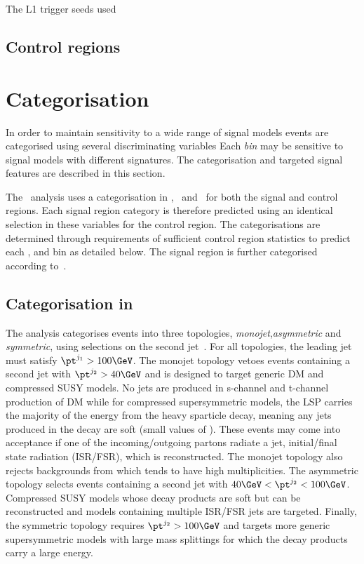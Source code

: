 The L1 trigger seeds used 
\subsection{Control regions}

\section{Categorisation}
\label{sec:cat}
In order to maintain sensitivity to a wide range of signal models events are categorised using
several discriminating variables Each \emph{bin} may be sensitive to signal models with different 
signatures. The categorisation and targeted signal features are described in this section.

The \alphat~analysis uses a categorisation in \njet, \nb~and \scalht~for both 
the signal and control regions. Each signal region category is therefore predicted using an identical 
selection in these variables for the control region. The categorisations are determined through requirements of sufficient
control region statistics to predict each \njet, \nb and \scalht bin as detailed below. The signal region is 
further categorised according to~\mht. 

\subsection{Categorisation in \njet}

The \alphat analysis categorises events into three topologies, \emph{monojet},\emph{asymmetric} 
and \emph{symmetric}, using selections on the second jet~\pt. For all topologies, the leading
jet must satisfy $\pt^{j_1} > 100 \GeV$.  The monojet topology vetoes events containing a second 
jet with $\pt^{j_2} > 40 \GeV$ and is designed to target generic DM 
and compressed SUSY models. No jets are produced in s-channel and t-channel production of DM
while for compressed supersymmetric models, the LSP carries the majority of the energy from 
the heavy sparticle decay, meaning any jets produced in the decay are soft (small values of \pt). 
These events may come into acceptance if one of the incoming/outgoing partons radiate a jet, initial/final state
radiation (ISR/FSR), which is reconstructed. The monojet topology also rejects backgrounds from 
\ttbar which tends to have high \njet multiplicities. The asymmetric topology selects events 
containing a second jet with $40 \GeV < \pt^{j_2} < 100 \GeV$.
Compressed SUSY models whose decay products are soft but can be reconstructed and models
containing multiple ISR/FSR jets are targeted. Finally, the symmetric topology requires  
$\pt^{j_2} > 100 \GeV$ and targets more generic supersymmetric models with large mass splittings 
for which the decay products carry a large energy.

